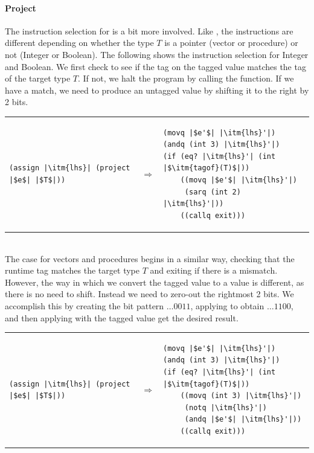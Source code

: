 \documentclass[11pt]{book}
\begin{document}
\paragraph{Project}


The instruction selection for  is a bit more involved.
Like , the instructions are different depending on whether
the type $T$ is a pointer (vector or procedure) or not (Integer or
Boolean). The following shows the instruction selection for Integer
and Boolean.  We first check to see if the tag on the tagged value
matches the tag of the target type $T$. If not, we halt the program by
calling the  function. If we have a match, we need to
produce an untagged value by shifting it to the right by 2 bits.
%
\\
\begin{tabular}{lll}
\begin{minipage}{0.4\textwidth}
\begin{lstlisting}
(assign |\itm{lhs}| (project |$e$| |$T$|))
\end{lstlisting}
\end{minipage}
&
$\Rightarrow$
&
\begin{minipage}{0.5\textwidth}
\begin{lstlisting}
(movq |$e'$| |\itm{lhs}'|)
(andq (int 3) |\itm{lhs}'|)
(if (eq? |\itm{lhs}'| (int |$\itm{tagof}(T)$|))
    ((movq |$e'$| |\itm{lhs}'|)
     (sarq (int 2) |\itm{lhs}'|))
    ((callq exit)))
\end{lstlisting}
\end{minipage}
\end{tabular}  \\
%
The case for vectors and procedures begins in a similar way, checking
that the runtime tag matches the target type $T$ and exiting if there
is a mismatch. However, the way in which we convert the tagged value
to a value is different, as there is no need to shift. Instead we need
to zero-out the rightmost 2 bits. We accomplish this by creating the
bit pattern $\ldots 0011$, applying  to obtain $\ldots
1100$, and then applying  with the tagged value get the
desired result. \\
%
\begin{tabular}{lll}
\begin{minipage}{0.4\textwidth}
\begin{lstlisting}
(assign |\itm{lhs}| (project |$e$| |$T$|))
\end{lstlisting}
\end{minipage}
&
$\Rightarrow$
&
\begin{minipage}{0.5\textwidth}
\begin{lstlisting}
(movq |$e'$| |\itm{lhs}'|)
(andq (int 3) |\itm{lhs}'|)
(if (eq? |\itm{lhs}'| (int |$\itm{tagof}(T)$|))
    ((movq (int 3) |\itm{lhs}'|)
     (notq |\itm{lhs}'|)
     (andq |$e'$| |\itm{lhs}'|))
    ((callq exit)))
\end{lstlisting}
\end{minipage}
\end{tabular}  \\
\end{document}
